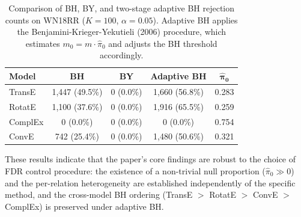 \begin{table}[h]
\centering
\caption{Comparison of BH, BY, and two-stage adaptive BH rejection counts on WN18RR ($K=100$, $\alpha = 0.05$). Adaptive BH applies the Benjamini-Krieger-Yekutieli (2006) procedure, which estimates $m_0 = m \cdot \hat{\pi}_0$ and adjusts the BH threshold accordingly.}
\label{tab:sensitivity-adapt}
\begin{tabular}{lcccc}
\toprule
\textbf{Model} & \textbf{BH} & \textbf{BY} & \textbf{Adaptive BH} & $\boldsymbol{\hat{\pi}_0}$ \\
\midrule
TransE   & 1{,}447 (49.5\%)  & 0 (0.0\%) & 1{,}660 (56.8\%) & 0.283 \\
RotatE   & 1{,}100 (37.6\%) & 0 (0.0\%) & 1{,}916 (65.5\%) & 0.259 \\
ComplEx  & 0 (0.0\%)   & 0 (0.0\%) & 0 (0.0\%)       & 0.754 \\
ConvE    & 742 (25.4\%) & 0 (0.0\%) & 1{,}480 (50.6\%) & 0.321 \\
\bottomrule
\end{tabular}
\end{table}

These results indicate that the paper's core findings are robust to the choice of FDR control procedure: the existence of a non-trivial null proportion ($\hat{\pi}_0 \gg 0$) and the per-relation heterogeneity are established independently of the specific method, and the cross-model BH ordering (TransE $>$ RotatE $>$ ConvE $>$ ComplEx) is preserved under adaptive BH.
